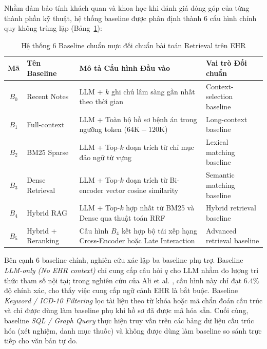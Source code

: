 Nhằm đảm bảo tính khách quan và khoa học khi đánh giá đóng góp của từng thành phần kỹ thuật, hệ thống baseline được phân định thành 6 cấu hình chính quy không trùng lặp (Bảng~\ref{tab:rag_baselines}):

\begin{table}[H]
\begin{singlespace}
\centering
\fontsize{8.5pt}{10.2pt}\selectfont
\setlength{\tabcolsep}{4pt}
\renewcommand{\arraystretch}{1.1}
\begin{tabular}{|c|l|p{6.8cm}|p{4.2cm}|}
\hline
\textbf{Mã} & \textbf{Tên Baseline} & \textbf{Mô tả Cấu hình Đầu vào} & \textbf{Vai trò Đối chuẩn} \\
\hline
$B_0$ & Recent Notes & LLM + $k$ ghi chú lâm sàng gần nhất theo thời gian & Context-selection baseline \\
\hline
$B_1$ & Full-context & LLM + Toàn bộ hồ sơ bệnh án trong ngưỡng token ($64\text{K} - 120\text{K}$) & Long-context baseline \\
\hline
$B_2$ & BM25 Sparse & LLM + Top-$k$ đoạn trích từ chỉ mục đảo ngữ từ vựng \cite{robertson2009} & Lexical matching baseline \\
\hline
$B_3$ & Dense Retrieval & LLM + Top-$k$ đoạn trích từ Bi-encoder vector cosine similarity & Semantic matching baseline \\
\hline
$B_4$ & Hybrid RAG & LLM + Top-$k$ hợp nhất từ BM25 và Dense qua thuật toán RRF & Hybrid retrieval baseline \\
\hline
$B_5$ & Hybrid + Reranking & Cấu hình $B_4$ kết hợp bộ tái xếp hạng Cross-Encoder hoặc Late Interaction & Advanced retrieval baseline \\
\hline
\end{tabular}
\caption{Hệ thống 6 Baseline chuẩn mực đối chuẩn bài toán Retrieval trên EHR}
\label{tab:rag_baselines}
\end{singlespace}
\end{table}

\noindent Bên cạnh 6 baseline chính, nghiên cứu xác lập ba baseline phụ trợ. Baseline \emph{LLM-only (No EHR context)} chỉ cung cấp câu hỏi $q$ cho LLM nhằm đo lượng tri thức tham số nội tại; trong nghiên cứu của Ali et al. \cite{ali2026biomedical}, cấu hình này chỉ đạt $6.4\%$ độ chính xác, cho thấy việc cung cấp ngữ cảnh EHR là bắt buộc. Baseline \emph{Keyword / ICD-10 Filtering} lọc tài liệu theo từ khóa hoặc mã chẩn đoán cấu trúc và chỉ được dùng làm baseline phụ khi hồ sơ đã được mã hóa sẵn. Cuối cùng, baseline \emph{SQL / Graph Query} thực hiện truy vấn trên các bảng dữ liệu cấu trúc hóa (xét nghiệm, danh mục thuốc) và không được dùng làm baseline so sánh trực tiếp cho văn bản tự do.

